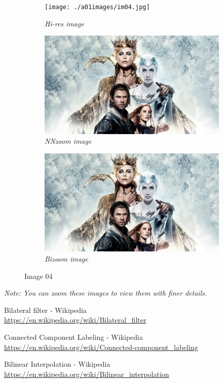 \documentclass[11pt, a4paper]{article}
\begin{document}
\begin{figure}[H]
	\centering
	\begin{subfigure}[b]{0.3\textwidth}
		\centering
		\texttt{[image: ./a01images/im04.jpg]}
		\caption{{\small \textit{Hi-res image}}}
	\end{subfigure}
	\hfill
	\begin{subfigure}[b]{0.3\textwidth}
		\centering
		\includegraphics[width=\textwidth]{./Outputs/nnzoomfloor04.jpg}
		\caption{{\small \textit{NNzoom image}}}
	\end{subfigure}
	\hfill
	\begin{subfigure}[b]{0.3\textwidth}
		\centering
		\includegraphics[width=\textwidth]{./Outputs/bizoom04.jpg}
		\caption{{\small \textit{Bizoom image}}}
	\end{subfigure}
	\caption{Image 04}
\end{figure}
\textit{Note: You can zoom these images to view them with finer details.}

\begin{thebibliography}{AA}
Bilateral filter - Wikipedia\\
\url{https://en.wikipedia.org/wiki/Bilateral_filter}

Connected Component Labeling - Wikipedia\\
\url{https://en.wikipedia.org/wiki/Connected-component_labeling}

Bilinear Interpolation - Wikipedia\\
\url{https://en.wikipedia.org/wiki/Bilinear_interpolation}

\nocite{Fwiki, CCwiki, Biwiki}
\end{thebibliography}
\end{document}

